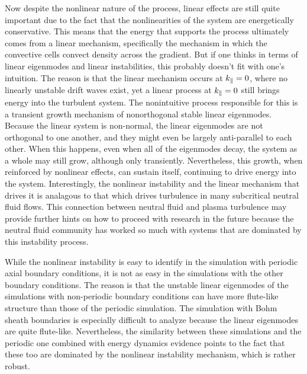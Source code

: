 Now despite the nonlinear nature of the process, linear effects are still quite important due to the fact that the nonlinearities of the system are energetically conservative.
This means that the energy that supports the process ultimately comes from a linear mechanism, specifically the mechanism in which the convective cells convect density across the gradient. 
But if one thinks in terms of linear eigenmodes and linear instabilities, this probably doesn't fit with one's intuition. 
The reason is that the linear mechanism occurs at $k_\parallel = 0$, where no linearly unstable drift
waves exist, yet a linear process at $k_\parallel = 0$ still brings energy into the turbulent system. The nonintuitive process responsible for this is a transient growth mechanism of nonorthogonal
stable linear eigenmodes. Because the linear system is non-normal, the linear eigenmodes are not orthogonal to one another, and they might even be largely anti-parallel to each other.
When this happens, even when all of the eigenmodes decay, the system as a whole may still grow, although only transiently. Nevertheless, this growth, when reinforced by nonlinear
effects, can sustain itself, continuing to drive energy into the system. Interestingly, the nonlinear instability and the linear mechanism that drives it is analagous to that which drives turbulence
in many subcritical neutral fluid flows. This connection between neutral fluid and plasma turbulence may provide further hints on how to proceed with research in the future because the neutral
fluid community has worked so much with systems that are dominated by this instability process.

While the nonlinear instability is easy to identify in the simulation with periodic axial boundary conditions, it is not as easy in the simulations with the other boundary conditions. The reason is
that the unstable linear eigenmodes of the simulations with non-periodic boundary conditions can have more flute-like structure than those of the periodic simulation. The simulation with Bohm
sheath boundaries is especially difficult to analyze because the linear eigenmodes are quite flute-like. Nevertheless, the similarity between these simulations and the periodic one combined
with energy dynamics evidence points to the fact that these too are dominated by the nonlinear instability mechanism, which is rather robust.

